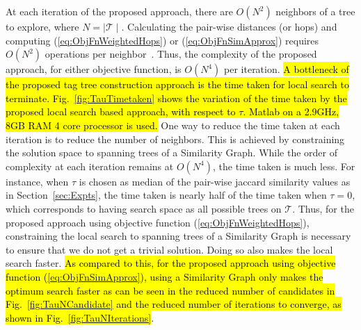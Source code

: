 At each iteration of the proposed approach, there are $O(N^2)$ neighbors of a tree to explore, where $N=\mid \mathcal{T} \mid$. Calculating the pair-wise distances (or hops) and computing (\ref{eq:ObjFnWeightedHops}) or (\ref{eq:ObjFnSimApprox}) requires $O(N^2)$ operations per neighbor~\cite{ford2010flows}. Thus, the complexity of the proposed approach, for either objective function, is $O(N^4)$ per iteration. \hl{A bottleneck of the proposed tag tree construction approach is the time taken for local search to terminate. Fig.~{\ref{fig:TauTimetaken}} shows the variation of the time taken by the proposed local search based approach, with respect to $\tau$. Matlab on a 2.9GHz, 8GB RAM 4 core processor is used.} One way to reduce the time taken at each iteration is to reduce the number of neighbors. This is achieved by constraining the solution space to spanning trees of a Similarity Graph. While the order of complexity at each iteration remains at $O(N^4)$, the time taken is much less. For instance, when $\tau$ is chosen as median of the pair-wise jaccard similarity values as in Section~\ref{sec:Expts}, the time taken is nearly half of the time taken when $\tau=0$, which corresponds to having search space as all possible trees on $\mathcal{T}$. 
Thus, for the proposed approach using objective function (\ref{eq:ObjFnWeightedHops}), constraining the local search to spanning trees of a Similarity Graph is necessary to ensure that we do not get a trivial solution.  Doing so also makes the local search faster. \hl{As compared to this, for the proposed approach using objective function ({\ref{eq:ObjFnSimApprox}}), using a Similarity Graph only makes the optimum search faster as can be seen in the reduced number of candidates in Fig.~{\ref{fig:TauNCandidate}} and the reduced number of iterations to converge, as shown in Fig.~{\ref{fig:TauNIterations}}}. 



